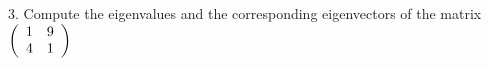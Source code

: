 \documentclass[letterpaper]{article}
\begin{document}
\begin{enumerate}
\begin{enumerate}
3. Compute the eigenvalues and the corresponding eigenvectors of the matrix $\left( \begin{array} {c c} 1 & 9 \\ 4 & 1\\ \end{array} \right)$
\end{enumerate}
\medskip

\end{enumerate}
\end{document}
